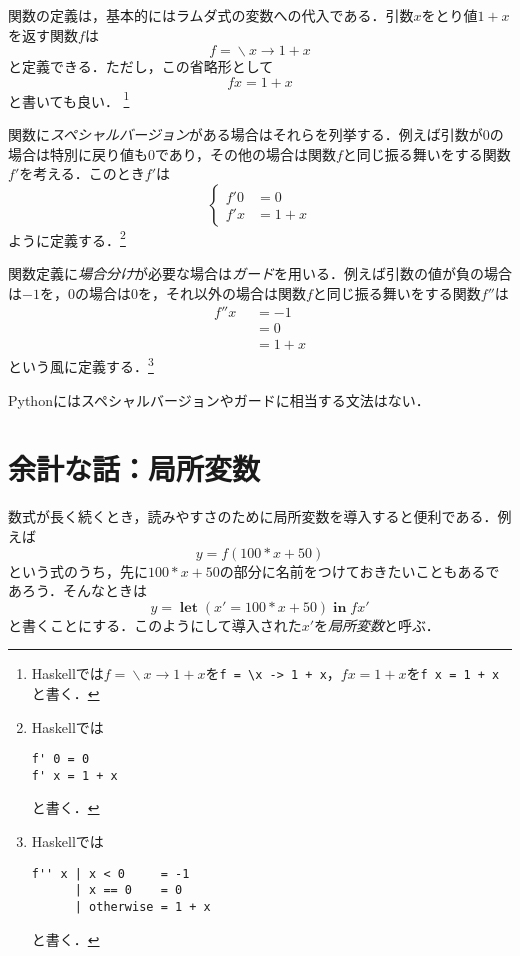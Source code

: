 \documentclass[twocolumn]{jsbook}
\newcommand{\keyword}[1]{{\emph{#1}}}
\newcommand{\code}[1]{\texttt{#1}}
\newcommand{\mathKeyword}[1]{\mathbf{#1}}
\DeclareMathOperator{\mathLambda}{\backslash}
\DeclareMathOperator{\mathLet}{\mathKeyword{let}}
\DeclareMathOperator{\mathLetIn}{\mathKeyword{in}}
\newcommand{\mathLambdaArrow}{\rightarrow}
\newcommand{\mathOtherwise}{\mathKeyword{otherwise}}
\newcommand{\mathGuard}[1]{\mathop{\mid_{#1}}}
\newcommand{\mathLambdaExpression}[2]{\mathLambda#1\mathLambdaArrow#2}
\begin{document}
関数の定義は，基本的にはラムダ式の変数への代入である．引数$x$をとり値$1+x$を返す関数$f$は$$f=\mathLambdaExpression{x}{1+x}$$と定義できる．ただし，この省略形として$$fx=1+x$$と書いても良い．
\footnote{Haskellでは$f=\mathLambdaExpression{x}{1+x}$を\code{f = \textbackslash x -> 1 + x}，$fx=1+x$を\code{f x = 1 + x}と書く．}

関数に\keyword{スペシャルバージョン}がある場合はそれらを列挙する．例えば引数が$0$の場合は特別に戻り値も$0$であり，その他の場合は関数$f$と同じ振る舞いをする関数$f'$を考える．このとき$f'$は
\begin{equation*}
\left\{
\begin{split}
f'0&=0\\
f'x&=1+x
\end{split}
\right.
\end{equation*}
ように定義する．\footnote{Haskellでは
\begin{Verbatim}[xleftmargin=10mm]
f' 0 = 0
f' x = 1 + x
\end{Verbatim}
と書く．}

関数定義に\keyword{場合分け}が必要な場合は\keyword{ガード}を用いる．例えば引数の値が負の場合は$-1$を，$0$の場合は$0$を，それ以外の場合は関数$f$と同じ振る舞いをする関数$f''$は
\begin{equation*}
\begin{split}
f''x&\mathGuard{x<0}=-1\\
&\mathGuard{x\equiv 0}=0\\
&\mathGuard{\mathOtherwise}=1+x
\end{split}
\end{equation*}
という風に定義する．\footnote{Haskellでは
\begin{Verbatim}[xleftmargin=10mm]
f'' x | x < 0     = -1
      | x == 0    = 0
      | otherwise = 1 + x
\end{Verbatim}
と書く．}

Pythonにはスペシャルバージョンやガードに相当する文法はない．

\section{余計な話：局所変数}

数式が長く続くとき，読みやすさのために局所変数を導入すると便利である．例えば$$y=f(100*x+50)$$という式のうち，先に$100*x+50$の部分に名前をつけておきたいこともあるであろう．そんなときは
\begin{equation}
\label{eq:letin}
y=\mathLet(x'=100*x+50)\mathLetIn fx'
\end{equation}
と書くことにする．このようにして導入された$x'$を\keyword{局所変数}と呼ぶ．
\end{document}
